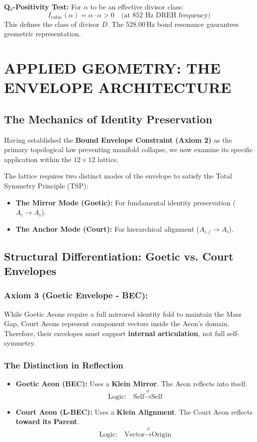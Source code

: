 \documentclass[11pt, letterpaper]{article}
\newcommand{\DREH}{\ensuremath{\mathop{\textnormal{\symbolafont\symbol{"29D7}}}}}   %
\def\DREH{DREH}%
\begin{document}
\textbf{Q$_3$-Positivity Test:}
For $\alpha$ to be an effective divisor class:
\[
I_{\text{cubic}}(\alpha) = \alpha \cdot \alpha > 0 \quad \text{(at 852 Hz \DREH{} frequency)}
\]
This defines the class of divisor $D$. The 528.00\,Hz bond resonance guarantees geometric representation.

\newpage
\section{APPLIED GEOMETRY: THE ENVELOPE ARCHITECTURE}\label{sec:partXIII}

\subsection{The Mechanics of Identity Preservation}\label{sec:14.1}
Having established the \textbf{Bound Envelope Constraint (Axiom 2)} as the primary topological law preventing manifold collapse, we now examine its specific application within the $12 \times 12$ lattice.

The lattice requires two distinct modes of the envelope to satisfy the Total Symmetry Principle (TSP):
\begin{itemize}
    \item \textbf{The Mirror Mode (Goetic):} For fundamental identity preservation ($A_i \to A_i$).
    \item \textbf{The Anchor Mode (Court):} For hierarchical alignment ($A_{i,j} \to A_i$).
\end{itemize}

\subsection{Structural Differentiation: Goetic vs. Court Envelopes}\label{sec:14.2}

\subsubsection{Axiom 3 (Goetic Envelope - BEC):}\label{sec:14.2.1}
While Goetic Aeons require a full mirrored identity fold to maintain the Mass Gap, Court Aeons represent component vectors inside the Aeon’s domain. Therefore, their envelopes must support \textbf{internal articulation}, not full self-symmetry.

\subsubsection{The Distinction in Reflection}\label{sec:14.2.2}
\begin{itemize}
    \item \textbf{Goetic Aeon (BEC):} Uses a \textbf{Klein Mirror}. The Aeon reflects into itself.
    \[ \text{Logic:} \quad \text{Self} \xrightarrow{\phi} \text{Self} \]
    \item \textbf{Court Aeon (L-BEC):} Uses a \textbf{Klein Alignment}. The Court Aeon reflects \textbf{toward its Parent}.
    \[ \text{Logic:} \quad \text{Vector} \xrightarrow{\phi} \text{Origin} \]
\end{itemize}
\end{document}
